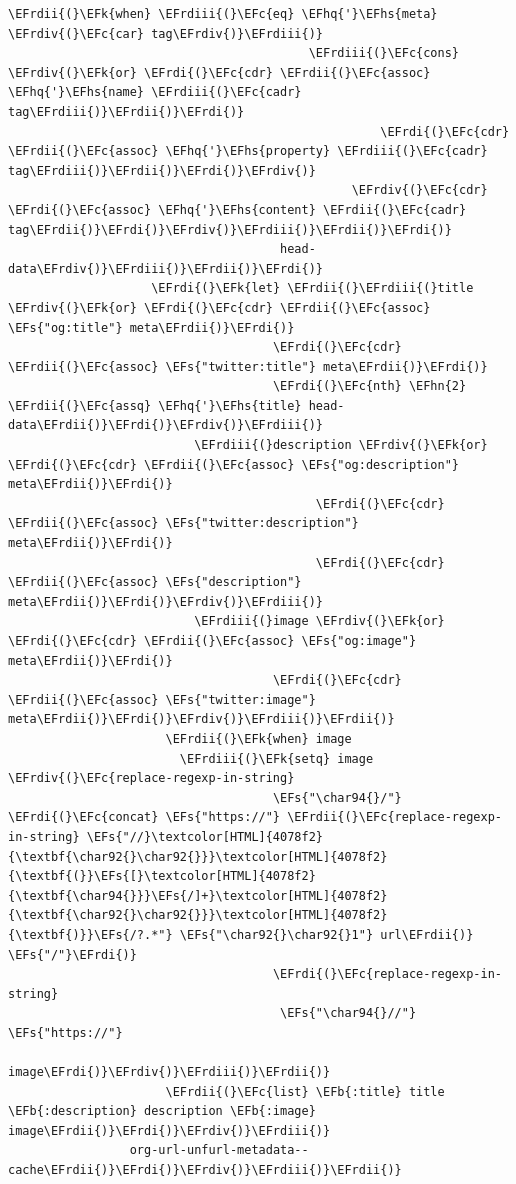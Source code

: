 \documentclass{scrartcl}
\newcommand{\EFk}[1]{\textcolor{EFk}{#1}} %
\newcommand{\EFs}[1]{\textcolor{EFs}{#1}} %
\newcommand{\EFb}[1]{\textcolor{EFb}{#1}} %
\newcommand{\EFc}[1]{\textcolor{EFc}{#1}} %
\newcommand{\EFhn}[1]{\textcolor{EFhn}{\textbf{#1}}} %
\newcommand{\EFhq}[1]{\textcolor{EFhq}{#1}} %
\newcommand{\EFhs}[1]{\textcolor{EFhs}{#1}} %
\newcommand{\EFrdi}[1]{\textcolor{EFrdi}{#1}} %
\newcommand{\EFrdii}[1]{\textcolor{EFrdii}{#1}} %
\newcommand{\EFrdiii}[1]{\textcolor{EFrdiii}{#1}} %
\newcommand{\EFrdiv}[1]{\textcolor{EFrdiv}{#1}} %
\begin{document}
\begin{Code}
\begin{Verbatim}[]
                                        \EFrdii{(}\EFk{when} \EFrdiii{(}\EFc{eq} \EFhq{'}\EFhs{meta} \EFrdiv{(}\EFc{car} tag\EFrdiv{)}\EFrdiii{)}
                                          \EFrdiii{(}\EFc{cons} \EFrdiv{(}\EFk{or} \EFrdi{(}\EFc{cdr} \EFrdii{(}\EFc{assoc} \EFhq{'}\EFhs{name} \EFrdiii{(}\EFc{cadr} tag\EFrdiii{)}\EFrdii{)}\EFrdi{)}
                                                    \EFrdi{(}\EFc{cdr} \EFrdii{(}\EFc{assoc} \EFhq{'}\EFhs{property} \EFrdiii{(}\EFc{cadr} tag\EFrdiii{)}\EFrdii{)}\EFrdi{)}\EFrdiv{)}
                                                \EFrdiv{(}\EFc{cdr} \EFrdi{(}\EFc{assoc} \EFhq{'}\EFhs{content} \EFrdii{(}\EFc{cadr} tag\EFrdii{)}\EFrdi{)}\EFrdiv{)}\EFrdiii{)}\EFrdii{)}\EFrdi{)}
                                      head-data\EFrdiv{)}\EFrdiii{)}\EFrdii{)}\EFrdi{)}
                    \EFrdi{(}\EFk{let} \EFrdii{(}\EFrdiii{(}title \EFrdiv{(}\EFk{or} \EFrdi{(}\EFc{cdr} \EFrdii{(}\EFc{assoc} \EFs{"og:title"} meta\EFrdii{)}\EFrdi{)}
                                     \EFrdi{(}\EFc{cdr} \EFrdii{(}\EFc{assoc} \EFs{"twitter:title"} meta\EFrdii{)}\EFrdi{)}
                                     \EFrdi{(}\EFc{nth} \EFhn{2} \EFrdii{(}\EFc{assq} \EFhq{'}\EFhs{title} head-data\EFrdii{)}\EFrdi{)}\EFrdiv{)}\EFrdiii{)}
                          \EFrdiii{(}description \EFrdiv{(}\EFk{or} \EFrdi{(}\EFc{cdr} \EFrdii{(}\EFc{assoc} \EFs{"og:description"} meta\EFrdii{)}\EFrdi{)}
                                           \EFrdi{(}\EFc{cdr} \EFrdii{(}\EFc{assoc} \EFs{"twitter:description"} meta\EFrdii{)}\EFrdi{)}
                                           \EFrdi{(}\EFc{cdr} \EFrdii{(}\EFc{assoc} \EFs{"description"} meta\EFrdii{)}\EFrdi{)}\EFrdiv{)}\EFrdiii{)}
                          \EFrdiii{(}image \EFrdiv{(}\EFk{or} \EFrdi{(}\EFc{cdr} \EFrdii{(}\EFc{assoc} \EFs{"og:image"} meta\EFrdii{)}\EFrdi{)}
                                     \EFrdi{(}\EFc{cdr} \EFrdii{(}\EFc{assoc} \EFs{"twitter:image"} meta\EFrdii{)}\EFrdi{)}\EFrdiv{)}\EFrdiii{)}\EFrdii{)}
                      \EFrdii{(}\EFk{when} image
                        \EFrdiii{(}\EFk{setq} image \EFrdiv{(}\EFc{replace-regexp-in-string}
                                     \EFs{"\char94{}/"} \EFrdi{(}\EFc{concat} \EFs{"https://"} \EFrdii{(}\EFc{replace-regexp-in-string} \EFs{"//}\textcolor[HTML]{4078f2}{\textbf{\char92{}\char92{}}}\textcolor[HTML]{4078f2}{\textbf{(}}\EFs{[}\textcolor[HTML]{4078f2}{\textbf{\char94{}}}\EFs{/]+}\textcolor[HTML]{4078f2}{\textbf{\char92{}\char92{}}}\textcolor[HTML]{4078f2}{\textbf{)}}\EFs{/?.*"} \EFs{"\char92{}\char92{}1"} url\EFrdii{)} \EFs{"/"}\EFrdi{)}
                                     \EFrdi{(}\EFc{replace-regexp-in-string}
                                      \EFs{"\char94{}//"} \EFs{"https://"}
                                      image\EFrdi{)}\EFrdiv{)}\EFrdiii{)}\EFrdii{)}
                      \EFrdii{(}\EFc{list} \EFb{:title} title \EFb{:description} description \EFb{:image} image\EFrdii{)}\EFrdi{)}\EFrdiv{)}\EFrdiii{)}
                 org-url-unfurl-metadata--cache\EFrdii{)}\EFrdi{)}\EFrdiv{)}\EFrdiii{)}\EFrdii{)}


\end{Verbatim}
\end{Code}
\end{document}
